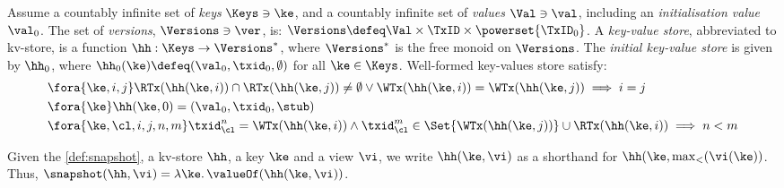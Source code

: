 \begin{definition}
\label{def:mkvs-appendix}
Assume a countably infinite set of \emph{keys} $\Keys \ni \ke$, 
and a countably infinite set of  \emph{values} $\Val \ni \val$, 
including an \emph{initialisation value} $\val_0 $.
The set of \emph{versions}, $\Versions \ni \ver$, is: $\Versions \defeq \Val \times \TxID \times \powerset{\TxID_{0}}$. 
A \emph{key-value store}, abbreviated to kv-store,  is a function $\hh: \Keys \rightarrow \Versions^{\ast}$, 
where $\Versions^{\ast}$ is the free monoid on $\Versions$. 
The \emph{initial key-value store} is given by $\hh_0$, where 
$\hh_{0}(\ke)\defeq  (\val_0, \txid_0, \emptyset)$ for
all $\ke \in \Keys$.
Well-formed key-values store satisfy:
\begin{align}
& \fora{\ke, i, j} 
\RTx(\hh(\ke, i)) \cap \RTx(\hh(\ke, j)) \neq \emptyset \lor
\WTx(\hh(\ke, i)) = \WTx(\hh(\ke, j))
\implies i = j  \\
& \fora{\ke} \hh(\ke, 0) = (\val_0, \txid_0, \stub) \\
& \fora{ \ke, \cl, i,j, n, m} 
\txid_{\cl}^{n} = \WTx(\hh(\ke,i)) \wedge \txid_{\cl}^{m} \in
\Set{\WTx(\hh(\ke,j))} \cup \RTx(\hh(\ke, i)) \implies n < m
\end{align}
\end{definition}

Given the \cref{def:snapshot}, 
a kv-store $\hh$, a key $\ke$ and a view $\vi$, 
we write $\hh(\ke, \vi)$ as a shorthand for 
$\hh(\ke, \max_{<}(\vi(\ke))$. Thus, $\snapshot(\hh, \vi) = \lambda \ke \ldotp \valueOf(\hh(\ke, \vi))$. 


